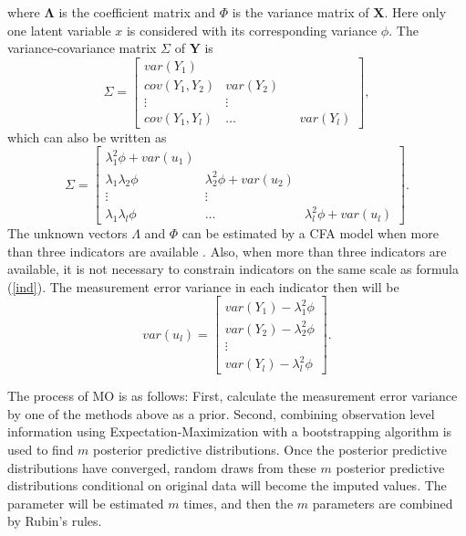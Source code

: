 \documentclass[oneside,a4paper]{article}
\begin{document}
where $\mathbf{\Lambda}$ is the coefficient matrix and $\Phi$ is the variance matrix of $\mathbf{X}$. Here only one latent variable $x$ is considered with its corresponding variance $\phi$. The variance-covariance matrix $\Sigma$ of $\textbf{Y}$ is
\begin{equation}
\Sigma =
\begin{bmatrix}
var(Y_1) &                           & \\
  cov(Y_1, Y_2) & var(Y_2)  & \\ 
              \vdots &    \vdots      \\       
     cov(Y_1, Y_l)&  \dots & &var(Y_l)  
\end{bmatrix},
\end{equation}
which can also be written as 
\begin{equation}
\Sigma =
\begin{bmatrix}
\lambda_1^2\phi + var(u_1)&                           & \\
 \lambda_1 \lambda_2 \phi & \lambda_2^2\phi + var(u_2)  & \\
              \vdots &   \vdots      \\             
  \lambda_1 \lambda_l \phi & \dots &\lambda_l^2\phi + var(u_l)
\end{bmatrix}.
\end{equation}
The unknown vectors $\Lambda$ and $\Phi$ can be estimated by a CFA model when more than three indicators are available \cite{SEM}. Also, when more than three indicators are available, it is not necessary to constrain indicators on the same scale as formula (\ref{ind}). The measurement error variance in each indicator then will be
\begin{equation}
var(u_l)=
\begin{bmatrix}
var(Y_1)-\lambda_1^2\phi\\var(Y_2)-\lambda_2^2\phi \\ \vdots\\var(Y_l)-\lambda_l^2\phi
\end{bmatrix}.
\end{equation}

The process of MO is as follows: First, calculate the measurement error variance by one of the methods above as a prior. Second, combining observation level information using Expectation-Maximization with a bootstrapping algorithm is used to find $m$ posterior predictive distributions. Once the posterior predictive distributions have converged, random draws from these $m$ posterior predictive distributions conditional on original data will become the imputed values. The parameter will be estimated $m$ times, and then the $m$ parameters are combined by Rubin's rules.
\end{document}
